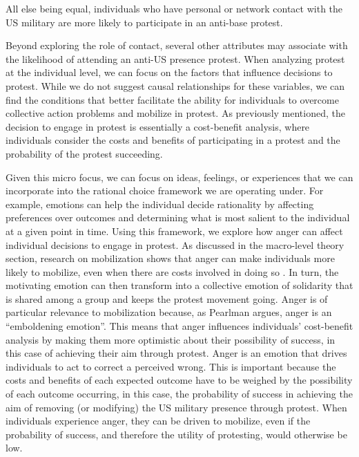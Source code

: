 		\begin{hyp}
			All else being equal, individuals who have personal or network contact with the US military are more likely to participate in an anti-base protest. 
		\end{hyp}
		
		Beyond exploring the role of contact, several other attributes may associate with the likelihood of attending an anti-US presence protest. When analyzing protest at the individual level, we can focus on the factors that influence decisions to protest. While we do not suggest causal relationships for these variables, we can find the conditions that better facilitate the ability for individuals to overcome collective action problems and mobilize in protest. As previously mentioned, the decision to engage in protest is essentially a cost-benefit analysis, where individuals consider the costs and benefits of participating in a protest and the probability of the protest succeeding.
		
		Given this micro focus, we can focus on ideas, feelings, or experiences that we can incorporate into the rational choice framework we are operating under.\cite{Elster1999} For example, emotions can help the individual decide rationality by affecting preferences over outcomes and determining what is most salient to the individual at a given point in time.\cite{deSousa1990,Pearlman2013} Using this framework, we explore how anger can affect individual decisions to engage in protest. As discussed in the macro-level theory section, research on mobilization shows that anger can make individuals more likely to mobilize, even when there are costs involved in doing so \cite{Gurr1968,Goodwin2009}. In turn, the motivating emotion can then transform into a collective emotion of solidarity that is shared among a group and keeps the protest movement going.\cite{Goodwin2009} Anger is of particular relevance to mobilization because, as Pearlman argues, anger is an ``emboldening emotion''.\cite[p. 388]{Pearlman2013} This means that anger influences individuals' cost-benefit analysis by making them more optimistic about their possibility of success, in this case of achieving their aim through protest. Anger is an emotion that drives individuals to act to correct a perceived wrong.\cite{Carver2009} This is important because the costs and benefits of each expected outcome have to be weighed by the possibility of each outcome occurring, in this case, the probability of success in achieving the aim of removing (or modifying) the US military presence through protest. When individuals experience anger, they can be driven to mobilize, even if the probability of success, and therefore the utility of protesting, would otherwise be low.  
		
